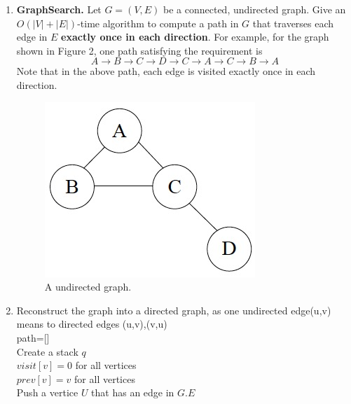 \documentclass[12pt,a4paper]{article}
\makeatletter
\newtheorem*{solution}{Solution}
\theoremstyle{definition}
\renewenvironment{solution}[1][Solution] {\par\pushQED{\qed}\normalfont\topsep6\p@\@plus6\p@\relax\trivlist\item[\hskip\labelsep\bfseries#1\@addpunct{.}]\ignorespaces}{\popQED\endtrivlist\@endpefalse} \makeatother
\makeatother
\begin{document}
\begin{enumerate}
\item \textbf{GraphSearch.} Let $G=(V,E)$ be a connected, undirected graph. Give an $O(|V|+|E|)$-time algorithm to compute a path in $G$ that traverses each edge in $E$ \textbf{exactly once in each direction}. For example, for the graph shown in Figure 2, one path satisfying the requirement is
$$A \rightarrow B \rightarrow C \rightarrow D \rightarrow C \rightarrow A \rightarrow C \rightarrow B \rightarrow A$$
Note that in the above path, each edge is visited exactly once in each direction.

\begin{figure}[h]
 \centering
 \includegraphics[scale=0.35]{Lab08-figure2.jpg}
 \caption{A undirected graph.}
\end{figure}

\begin{solution}
\begin{flushleft}
  
\end{flushleft}
\begin{algorithm}[H]
Reconstruct the graph into a directed graph, as one undirected edge(u,v) means to directed edges (u,v),(v,u)\\
path=[] \\
Create a stack $q$ \\
$visit[v] = 0$ for all vertices \\
$prev[v] = v$ for all vertices \\
Push a vertice $U$ that has an edge in $G.E$ \\
\end{algorithm}
\end{solution}
\end{enumerate}
\end{document}
